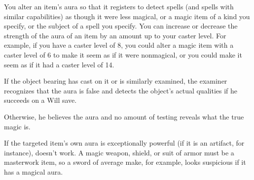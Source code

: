 \begin{spelleffect}
You alter an item's aura so that it registers  to  detect spells (and spells with similar  capabilities) as though it were less magical, or a magic item of a kind you specify, or the subject of a spell you specify. You can increase or decrease the strength of the aura of an item by an amount up to your caster level. For example, if you have a caster level of 8, you could alter a magic item with a caster level of 6 to make it seem as if it were nonmagical, or you could make it seem as if it had a caster level of 14.
\par If the object bearing   has  cast on it or is similarly examined, the examiner recognizes that the aura is false and detects the object's actual qualities if he succeeds on a Will save.
\par Otherwise, he believes the aura and no  amount of testing reveals what the true  magic is.
\par If the targeted item's own aura is exceptionally powerful (if it is an artifact, for  instance),  doesn't work.
 A magic weapon, shield, or suit of  armor must be a masterwork item, so a  sword of average make, for example, looks  suspicious if it has a magical aura.
\end{spelleffect}

